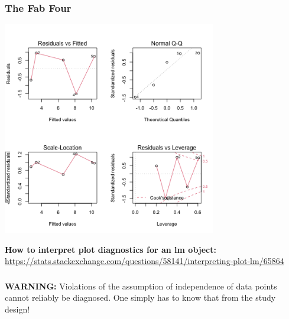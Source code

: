 \documentclass{beamer}
\begin{document}
\begin{frame}
    \frametitle{The Fab Four}
        \centering\includegraphics[width=0.7\textwidth]{lectures/day_2_LM_refresh_I/figures/unnamed-chunk-40-1.png} 
        \centering\scalebox{0.75}{
            
        }
\end{frame}

\begin{frame}
    \large\textbf{How to interpret plot diagnostics for an lm object:}
    \url{https://stats.stackexchange.com/questions/58141/interpreting-plot-lm/65864}
\end{frame}

\begin{frame}
    \frametitle{}
    \textbf{WARNING:} Violations of the assumption of independence of data points cannot reliably be diagnosed. One simply has to know that from the study design!
\end{frame}
\end{document}
